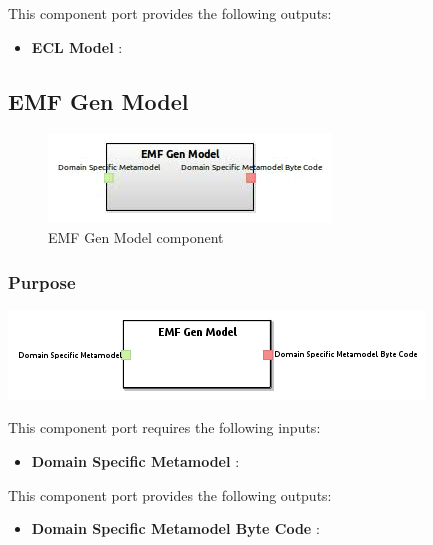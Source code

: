 \documentclass{gemoc} %
\begin{document}
This component port provides the following outputs:
\begin{itemize}
  \item \textbf{ECL Model} :
\end{itemize}

\subsection{EMF Gen Model}

\begin{figure}[htp]
	\begin{center}
	\includegraphics*[trim=0.0cm 0.0cm 0cm 0.0cm, clip=true, scale=1.0]{../images/generated/Generated_EMF Gen Model.jpg}
	\caption{EMF Gen Model component}
	\end{center}
\end{figure}

\subsubsection{Purpose}

\begin{center}
\includegraphics*[trim=0.0cm 0.0cm 0cm 0.0cm, clip=true]{../images/generated/Generated_EMF_Gen_Model.png}
\end{center}

This component port requires the following inputs:
\begin{itemize}
  \item \textbf{Domain Specific Metamodel} :
\end{itemize}

This component port provides the following outputs:
\begin{itemize}
  \item \textbf{Domain Specific Metamodel Byte Code} :
\end{itemize}
\end{document}
